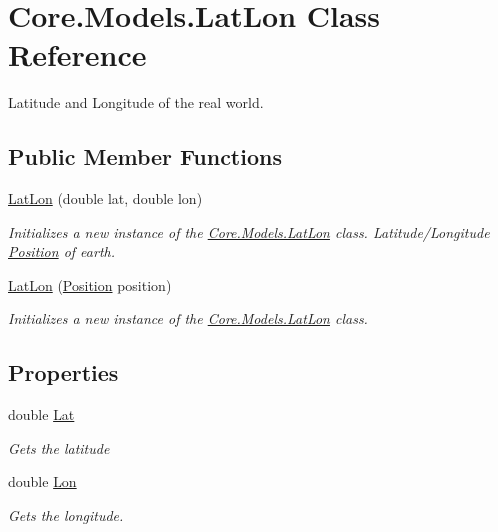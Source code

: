 \hypertarget{classCore_1_1Models_1_1LatLon}{}\section{Core.\+Models.\+Lat\+Lon Class Reference}
\label{classCore_1_1Models_1_1LatLon}


Latitude and Longitude of the real world.  


\subsection*{Public Member Functions}
\begin{DoxyCompactItemize}
\item 
\hyperlink{classCore_1_1Models_1_1LatLon_a5f0b81d9ee32d5df7001076a186db0ba}{Lat\+Lon} (double lat, double lon)
\begin{DoxyCompactList}\small\item\em Initializes a new instance of the \hyperlink{classCore_1_1Models_1_1LatLon}{Core.\+Models.\+Lat\+Lon} class. Latitude/\+Longitude \hyperlink{classCore_1_1Models_1_1Position}{Position} of earth. \end{DoxyCompactList}\item 
\hyperlink{classCore_1_1Models_1_1LatLon_a61ef0fd0335e0942d600ef80b7f0fcce}{Lat\+Lon} (\hyperlink{classCore_1_1Models_1_1Position}{Position} position)
\begin{DoxyCompactList}\small\item\em Initializes a new instance of the \hyperlink{classCore_1_1Models_1_1LatLon}{Core.\+Models.\+Lat\+Lon} class. \end{DoxyCompactList}\end{DoxyCompactItemize}
\subsection*{Properties}
\begin{DoxyCompactItemize}
\item 
double \hyperlink{classCore_1_1Models_1_1LatLon_a3b195e6b2a2f11d19ff283e921343638}{Lat}
\begin{DoxyCompactList}\small\item\em Gets the latitude \end{DoxyCompactList}\item 
double \hyperlink{classCore_1_1Models_1_1LatLon_af16c7196d72b996c3b7f593f9ea174f1}{Lon}
\begin{DoxyCompactList}\small\item\em Gets the longitude. \end{DoxyCompactList}\end{DoxyCompactItemize}


